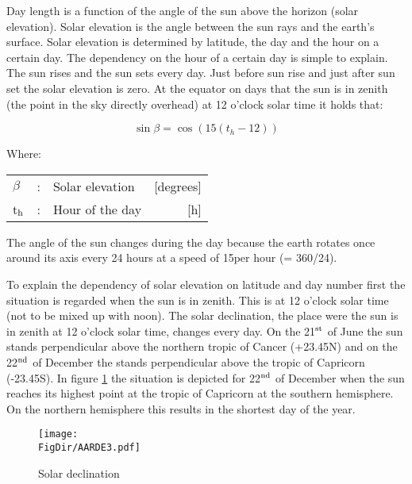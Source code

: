Day length is a function of the angle of the sun above the horizon (solar elevation). Solar
elevation is the angle between the sun rays and the earth's surface. Solar elevation is
determined by latitude, the day and the hour on a certain day.
The dependency on the hour of a certain day is simple to explain. The sun rises and the
sun sets every day. Just before sun rise and just after sun set the solar elevation is zero. 
At the equator on days that the sun is in zenith (the point in the sky directly overhead) at 
12 o'clock solar time it holds that:

\begin{equation}
\sin \beta = \cos (15(t _{h} -12))
\end{equation}

Where:\\[5pt]
\begin{tabularx}{\textwidth}{llXr}
$\beta$ &:& Solar elevation  & [degrees]\\
t$_{{\rm h}}$ &:& Hour of the day  & [h]\\
\end{tabularx}

The angle of the sun changes during the day because the earth rotates once around its axis
every 24 hours at a speed of 15\degrees per hour (= 360/24).  

To explain the dependency of solar elevation on latitude and day number first the situation
is regarded when the sun is in zenith. This is at 12 o'clock solar time (not to be mixed up
with noon). The solar declination, the place were the sun is in zenith at 12 o'clock solar
time, changes every day. On the 21$^{\rm st}$ of June the sun stands perpen\-dicular above 
the northern tropic of Cancer (+23.45\degrees N) and on the 22$^{\rm nd}$ of December the 
stands perpendicular above the tropic of Capricorn (-23.45\degrees S). In figure 
\ref{fig:solardecl} the situation is depicted for 22$^{\rm nd}$ of December when the sun 
reaches its highest point at the tropic of Capricorn at the southern hemisphere. On the 
northern hemisphere this results in the shortest day of the year.

\begin{figure}[p]
\centering
\texttt{[image: \\FigDir/AARDE3.pdf]}
\caption{Solar declination}
\label{fig:solardecl}
\end{figure}

